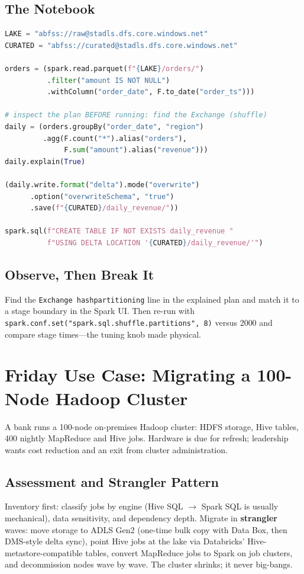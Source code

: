\subsection{The Notebook}
\begin{lstlisting}[language=Python,caption={Distributed aggregation: lake in, Delta out, plan inspected.},label={lst:ch9-notebook}]
LAKE = "abfss://raw@stadls.dfs.core.windows.net"
CURATED = "abfss://curated@stadls.dfs.core.windows.net"

orders = (spark.read.parquet(f"{LAKE}/orders/")
          .filter("amount IS NOT NULL")
          .withColumn("order_date", F.to_date("order_ts")))

# inspect the plan BEFORE running: find the Exchange (shuffle)
daily = (orders.groupBy("order_date", "region")
         .agg(F.count("*").alias("orders"),
              F.sum("amount").alias("revenue")))
daily.explain(True)

(daily.write.format("delta").mode("overwrite")
      .option("overwriteSchema", "true")
      .save(f"{CURATED}/daily_revenue/"))

spark.sql(f"CREATE TABLE IF NOT EXISTS daily_revenue "
          f"USING DELTA LOCATION '{CURATED}/daily_revenue/'")
\end{lstlisting}

\subsection{Observe, Then Break It}
Find the \texttt{Exchange hashpartitioning} line in the explained plan and match it to a stage boundary in the Spark UI. Then re-run with \texttt{spark.conf.set("spark.sql.shuffle.partitions", 8)} versus 2000 and compare stage times---the tuning knob made physical.

\section{Friday Use Case: Migrating a 100-Node Hadoop Cluster}
A bank runs a 100-node on-premises Hadoop cluster: HDFS storage, Hive tables, 400 nightly MapReduce and Hive jobs. Hardware is due for refresh; leadership wants cost reduction and an exit from cluster administration.

\subsection{Assessment and Strangler Pattern}
Inventory first: classify jobs by engine (Hive SQL $\rightarrow$ Spark SQL is usually mechanical), data sensitivity, and dependency depth. Migrate in \textbf{strangler} waves: move storage to ADLS Gen2 (one-time bulk copy with Data Box, then DMS-style delta sync), point Hive jobs at the lake via Databricks' Hive-metastore-compatible tables, convert MapReduce jobs to Spark on job clusters, and decommission nodes wave by wave. The cluster shrinks; it never big-bangs.

